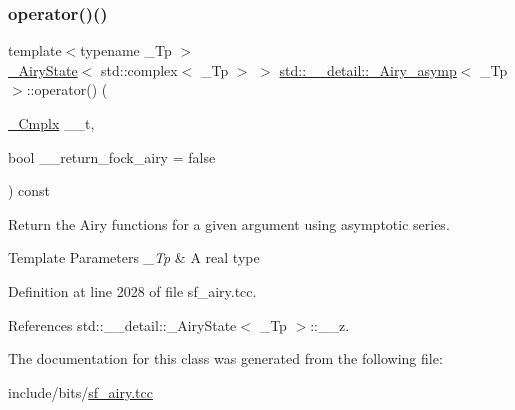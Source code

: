 \subsubsection{\texorpdfstring{operator()()}{operator()()}}
{\footnotesize\ttfamily template$<$typename \+\_\+\+Tp $>$ \\
\hyperlink{structstd_1_1____detail_1_1__AiryState}{\+\_\+\+Airy\+State}$<$ std\+::complex$<$ \+\_\+\+Tp $>$ $>$ \hyperlink{classstd_1_1____detail_1_1__Airy__asymp}{std\+::\+\_\+\+\_\+detail\+::\+\_\+\+Airy\+\_\+asymp}$<$ \+\_\+\+Tp $>$\+::operator() (\begin{DoxyParamCaption}\item[{\hyperlink{classstd_1_1____detail_1_1__Airy__asymp_ae28f102423d34e78502ab6da42d67f50}{\+\_\+\+Cmplx}}]{\+\_\+\+\_\+t,  }\item[{bool}]{\+\_\+\+\_\+return\+\_\+fock\+\_\+airy = {\ttfamily false} }\end{DoxyParamCaption}) const}

Return the Airy functions for a given argument using asymptotic series.


\begin{DoxyTemplParams}{Template Parameters}
{\em \+\_\+\+Tp} & A real type \\
\hline
\end{DoxyTemplParams}


Definition at line 2028 of file sf\+\_\+airy.\+tcc.



References std\+::\+\_\+\+\_\+detail\+::\+\_\+\+Airy\+State$<$ \+\_\+\+Tp $>$\+::\+\_\+\+\_\+z.



The documentation for this class was generated from the following file\+:\begin{DoxyCompactItemize}
\item 
include/bits/\hyperlink{sf__airy_8tcc}{sf\+\_\+airy.\+tcc}\end{DoxyCompactItemize}
